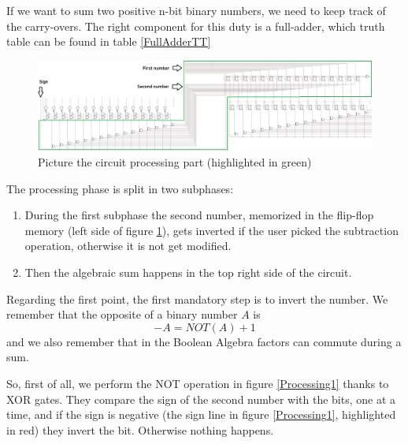 \documentclass{article}
\begin{document}
If we want to sum two positive n-bit binary numbers, we need to keep track of the carry-overs. The right component for this duty is a full-adder, which truth table can be found in table \ref{FullAdderTT}






\begin{table}
  
\end{table}



















\clearpage
\begin{figure}[h]
  \centering
  \includegraphics[scale=0.43]{SC_Processing_Total.JPG}
  \caption{Picture the circuit processing part (highlighted in green)}
  \label{Processing_Total}
\end{figure}

The processing phase is split in two subphases:
\begin{enumerate}
  \item During the first subphase the second number, memorized in the flip-flop memory (left side of figure \ref{Processing_Total}), gets inverted if the user picked the subtraction operation, otherwise it is not get modified.
  \item Then the algebraic sum happens in the top right side of the circuit.
\end{enumerate}

Regarding the first point, the first mandatory step is to invert the number. We remember that the opposite of a binary number $A$ is
\begin{equation}
-A=NOT(A)+1
\label{Law}
\end{equation}
and we also remember that in the Boolean Algebra factors can commute during a sum.

So, first of all, we perform the NOT operation in figure \ref{Processing1} thanks to XOR gates. They compare the sign of the second number with the bits, one at a time, and if the sign is negative (the sign line in figure \ref{Processing1}, highlighted in red) they invert the bit. Otherwise nothing happens.
\end{document}
